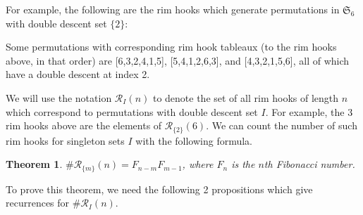 \documentclass[11pt, a4paper, reqno]{article}
\numberwithin{equation}{section}
\newtheorem{theorem}{Theorem}[section]
\theoremstyle{definition}
\begin{document}
	 For example, the following are the rim hooks which generate permutations in $\mathfrak{S}_6$ with double descent set $\{2\}$: 
	\vspace{0.3cm}
	\begin{center}
	         \hspace{1cm}  \hspace{1cm} 
	\end{center}
	\vspace{0.3cm}
	Some permutations with corresponding rim hook tableaux (to the rim hooks above, in that order) are [6,3,2,4,1,5], [5,4,1,2,6,3], and [4,3,2,1,5,6], all of which have a double descent at index 2.
	
	 We will use the notation $\mathcal{R}_I(n)$ to denote the set of all rim hooks of length $n$ which correspond to permutations with double descent set $I$. For example, the 3 rim hooks above are the elements of $\mathcal{R}_{\{2\}}(6)$. We can count the number of such rim hooks for singleton sets $I$ with the following formula.
	\begin{theorem}\label{rimhookrec}
	    $\#\mathcal{R}_{\{m\}}(n) = F_{n-m}F_{m-1}$, where $F_n$ is the $n$th Fibonacci number.
	\end{theorem}
	To prove this theorem, we need the following 2 propositions which give recurrences for $\#\mathcal{R}_I(n)$.
	
\end{document}
